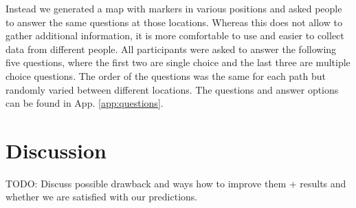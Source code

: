 \documentclass[letterpaper]{article}
\begin{document}
Instead we generated a map with markers in various positions and asked people to answer the same questions at those locations. Whereas this does not allow to gather additional information, it is more comfortable to use and easier to collect data from different people. All participants were asked to answer the following five questions, where the first two are single choice and the last three are multiple choice questions. The order of the questions was the same for each path but randomly varied between different locations. The questions and answer options can be found in App. \ref{app:questions}.

\section{Discussion}\label{sec:discussion}
TODO: Discuss possible drawback and ways how to improve them + results and whether we are satisfied with our predictions.
\end{document}
